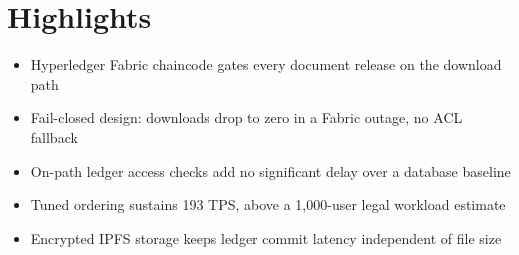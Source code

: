 \documentclass{article}
\begin{document}
\section*{Highlights}
\begin{itemize}
\item Hyperledger Fabric chaincode gates every document release on the download path
\item Fail-closed design: downloads drop to zero in a Fabric outage, no ACL fallback
\item On-path ledger access checks add no significant delay over a database baseline
\item Tuned ordering sustains 193 TPS, above a 1,000-user legal workload estimate
\item Encrypted IPFS storage keeps ledger commit latency independent of file size
\end{itemize}
\end{document}
